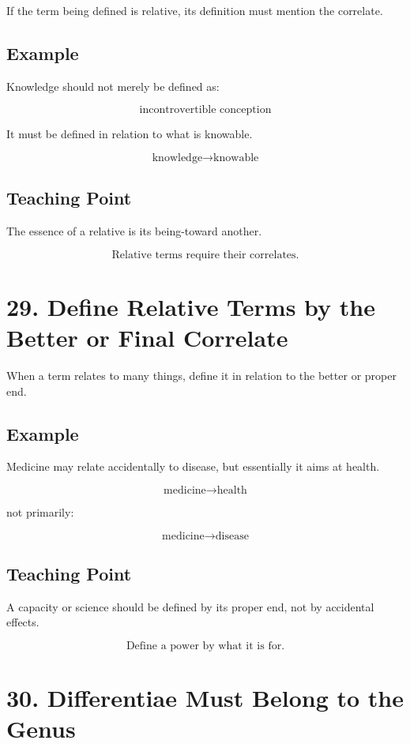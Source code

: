 \documentclass[12pt]{article}
\begin{document}
If the term being defined is relative, its definition must mention the
correlate.

\subsection*{Example}

Knowledge should not merely be defined as:

\[
\text{incontrovertible conception}
\]

It must be defined in relation to what is knowable.

\[
\text{knowledge} \rightarrow \text{knowable}
\]

\subsection*{Teaching Point}

The essence of a relative is its being-toward another.

\[
\boxed{
\text{Relative terms require their correlates.}
}
\]

\section*{29. Define Relative Terms by the Better or Final Correlate}

When a term relates to many things, define it in relation to the better or
proper end.

\subsection*{Example}

Medicine may relate accidentally to disease, but essentially it aims at health.

\[
\text{medicine} \rightarrow \text{health}
\]

not primarily:

\[
\text{medicine} \rightarrow \text{disease}
\]

\subsection*{Teaching Point}

A capacity or science should be defined by its proper end, not by accidental
effects.

\[
\boxed{
\text{Define a power by what it is for.}
}
\]

\section*{30. Differentiae Must Belong to the Genus}
\end{document}
